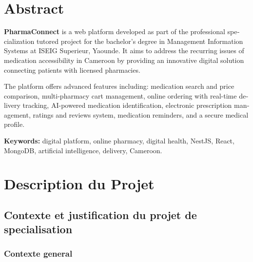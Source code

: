 \documentclass[12pt,a4paper]{report}
\begin{document}
\chapter*{Abstract}

\begin{mdframed}[linecolor=bleuInfo,linewidth=1.5pt,roundcorner=6pt,backgroundcolor=bleuInfo!5]
\begin{english}
\textbf{PharmaConnect} is a web platform developed as part of the professional specialization tutored project for the bachelor's degree in Management Information Systems at ISEIG Superieur, Yaounde. It aims to address the recurring issues of medication accessibility in Cameroon by providing an innovative digital solution connecting patients with licensed pharmacies.

\medskip
The platform offers advanced features including: medication search and price comparison, multi-pharmacy cart management, online ordering with real-time delivery tracking, AI-powered medication identification, electronic prescription management, ratings and reviews system, medication reminders, and a secure medical profile.

\medskip
\textbf{Keywords:} digital platform, online pharmacy, digital health, NestJS, React, MongoDB, artificial intelligence, delivery, Cameroon.
\end{english}
\end{mdframed}

\setcounter{page}{1}

\chapter{Description du Projet}

\section{Contexte et justification du projet de specialisation}

\subsection{Contexte general}
\end{document}
